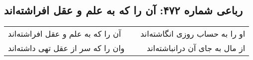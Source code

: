 \begin{center}
\section*{رباعی شماره ۴۷۲: آن را که به علم و عقل افراشته‌اند}
\label{sec:0472}
\begin{longtable}{l p{0.5cm} r}
آن را که به علم و عقل افراشته‌اند
&&
او را به حساب روزی انگاشته‌اند
\\
وان را که سر از عقل تهی داشته‌اند
&&
از مال به جای آن درانباشته‌اند
\\
\end{longtable}
\end{center}
